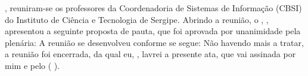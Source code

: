 \documentclass[12pt,a4paper]{ata}
\begin{document}
%
\label{Introdução da ata}
\hojeporextenso, reuniram-se \tiporeuniaoadv{} os professores da Coordenadoria de Sistemas de Informação (CBSI) do Instituto de Ciência e Tecnologia de Sergipe.
%
\presentes
%
%
\justificados
%
\ausentes
%
Abrindo a reunião, o \prof \presidiu, \cargopresidiu, apresentou a
seguinte proposta de pauta, que foi aprovada por unanimidade pela
plenária:
%
\pauta
%
A reunião se desenvolveu conforme se segue:
% 
\desenvolvimento
% 
Não havendo mais a tratar, a reunião foi encerrada, da qual eu,
\secretariou, lavrei a presente ata, que vai assinada por mim e pelo 
\cargopresidiu \space ( \presidiu).
%

\imprimirRegiaoAssinaturaPresentes
\end{document}
